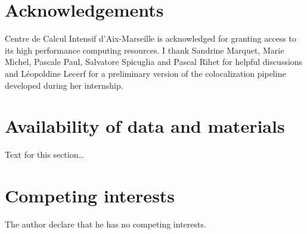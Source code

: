 
\begin{backmatter}

    \section*{Acknowledgements}%
    Centre de Calcul Intensif d'Aix-Marseille is acknowledged for granting access to its high performance computing resources.
%
    I thank Sandrine Marquet, Marie Michel, Pascale Paul, Salvatore Spicuglia and Pascal Rihet for helpful discussions and Léopoldine Lecerf for a preliminary version of the colocalization pipeline developed during her internship.



    \section*{Availability of data and materials}%
    Text for this section\ldots


    \section*{Competing interests}
    The author declare that he has no competing interests.



\end{backmatter}
